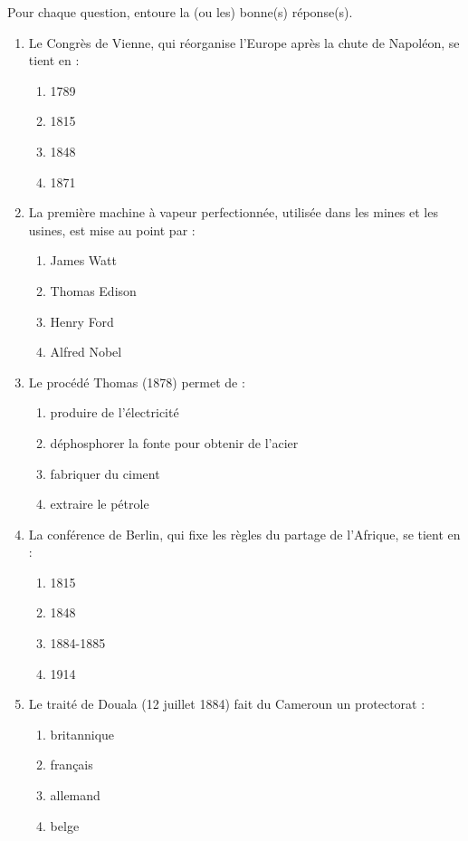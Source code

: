 \documentclass[11pt]{article}
\begin{document}
\begin{exercice}
Pour chaque question, entoure la (ou les) bonne(s) réponse(s).
\begin{enumerate}
\item Le Congrès de Vienne, qui réorganise l'Europe après la chute de Napoléon, se tient en :
\begin{enumerate}
\item 1789 \item 1815 \item 1848 \item 1871
\end{enumerate}
\item La première machine à vapeur perfectionnée, utilisée dans les mines et les usines, est mise au point par :
\begin{enumerate}
\item James Watt \item Thomas Edison \item Henry Ford \item Alfred Nobel
\end{enumerate}
\item Le procédé Thomas (1878) permet de :
\begin{enumerate}
\item produire de l'électricité \item déphosphorer la fonte pour obtenir de l'acier \item fabriquer du ciment \item extraire le pétrole
\end{enumerate}
\item La conférence de Berlin, qui fixe les règles du partage de l'Afrique, se tient en :
\begin{enumerate}
\item 1815 \item 1848 \item 1884-1885 \item 1914
\end{enumerate}
\item Le traité de Douala (12 juillet 1884) fait du Cameroun un protectorat :
\begin{enumerate}
\item britannique \item français \item allemand \item belge
\end{enumerate}
\end{enumerate}
\end{exercice}
\end{document}
